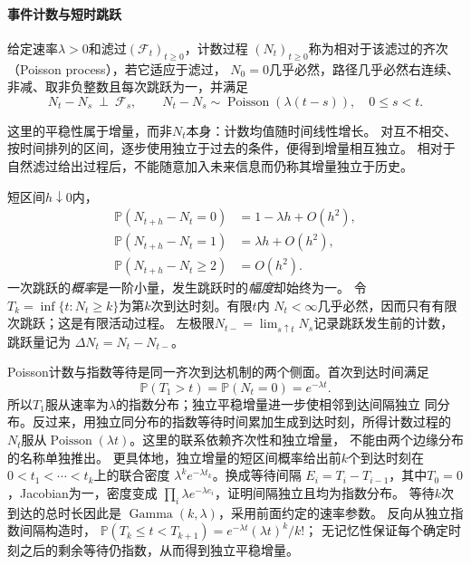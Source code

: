 \paragraph{事件计数与短时跳跃}
\begin{definition}[齐次Poisson过程]
\label{def:rv-poisson-process}
给定速率\(\lambda>0\)和滤过\((\mathcal F_t)_{t\geq0}\)，计数过程
\((N_t)_{t\geq0}\)称为相对于该滤过的齐次（Poisson process），若它适应于滤过，
\(N_0=0\)几乎必然，路径几乎必然右连续、非减、取非负整数且每次跳跃为一，并满足
\[
N_t-N_s\ \perp\ \mathcal F_s,\qquad
N_t-N_s\sim\operatorname{Poisson}(\lambda(t-s)),
\quad 0\leq s<t.
\]
\end{definition}
这里的平稳性属于增量，而非\(N_t\)本身：计数均值随时间线性增长。
对互不相交、按时间排列的区间，逐步使用独立于过去的条件，便得到增量相互独立。
相对于自然滤过给出过程后，不能随意加入未来信息而仍称其增量独立于历史。

短区间\(h\downarrow0\)内，
\[
\begin{aligned}
\mathbb P(N_{t+h}-N_t=0)&=1-\lambda h+O(h^2),\\
\mathbb P(N_{t+h}-N_t=1)&=\lambda h+O(h^2),\\
\mathbb P(N_{t+h}-N_t\geq2)&=O(h^2).
\end{aligned}
\]
一次跳跃的\emph{概率}是一阶小量，发生跳跃时的\emph{幅度}却始终为一。
令\(T_k=\inf\{t:N_t\geq k\}\)为第\(k\)次到达时刻。有限\(t\)内
\(N_t<\infty\)几乎必然，因而只有有限次跳跃；这是有限活动过程。
左极限\(N_{t-}=\lim_{s\uparrow t}N_s\)记录跳跃发生前的计数，跳跃量记为
\(\Delta N_t=N_t-N_{t-}\)。

Poisson计数与指数等待是同一齐次到达机制的两个侧面。首次到达时间满足
\[
  \mathbb{P}(T_1>t)
  =
  \mathbb{P}(N_t=0)
  =
  e^{-\lambda t}.
\]
所以\(T_1\)服从速率为\(\lambda\)的指数分布；独立平稳增量进一步使相邻到达间隔独立
同分布。反过来，用独立同分布的指数等待时间累加生成到达时刻，所得计数过程的
\(N_t\)服从\(\operatorname{Poisson}(\lambda t)\)。这里的联系依赖齐次性和独立增量，
不能由两个边缘分布的名称单独推出。
更具体地，独立增量的短区间概率给出前\(k\)个到达时刻在
\(0<t_1<\cdots<t_k\)上的联合密度
\(\lambda^k e^{-\lambda t_k}\)。换成等待间隔
\(E_i=T_i-T_{i-1}\)，其中\(T_0=0\)，Jacobian为一，密度变成
\(\prod_i\lambda e^{-\lambda e_i}\)，证明间隔独立且均为指数分布。
等待\(k\)次到达的总时长因此是
\(\operatorname{Gamma}(k,\lambda)\)，采用前面约定的速率参数。
反向从独立指数间隔构造时，
\(\mathbb P(T_k\leq t<T_{k+1})=e^{-\lambda t}(\lambda t)^k/k!\)；
无记忆性保证每个确定时刻之后的剩余等待仍指数，从而得到独立平稳增量。

